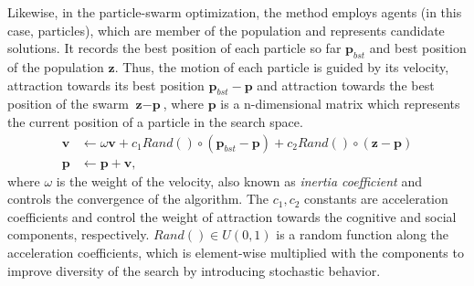 Likewise, in the particle-swarm optimization, the method employs agents (in this case, particles), which are member of the population and represents candidate solutions. It records the best position of each particle so far $\textbf{p}_{bst}$ and best position of the population $\textbf{z}$. Thus, the motion of each particle is guided by its velocity, attraction towards its best position $\textbf{p}_{bst}-\textbf{p}$ and attraction towards the best position of the swarm $\textbf{z}-\textbf{p}$, where $\textbf{p}$ is a n-dimensional matrix which represents the current position of a particle in the search space.
\begin{align}
\label{eqn_pso_velocity}
\textbf{v} &\leftarrow  \omega\textbf{v} + c_1Rand()\circ(\textbf{p}_{bst}-\textbf{p}) + c_2Rand()\circ(\textbf{z}-\textbf{p})\\
\label{eqn_pso_position}
\textbf{p} &\leftarrow \textbf{p} + \textbf{v},
\end{align}
where $\omega$ is the weight of the velocity, also known as \textit{inertia coefficient} and controls the convergence of the algorithm. The $c_1, c_2$ constants are acceleration coefficients and control the weight of attraction towards the cognitive and social components, respectively. $Rand()\in U(0,1)$ is a random function along the acceleration coefficients, which is element-wise multiplied with the components to improve diversity of the search by introducing stochastic behavior.